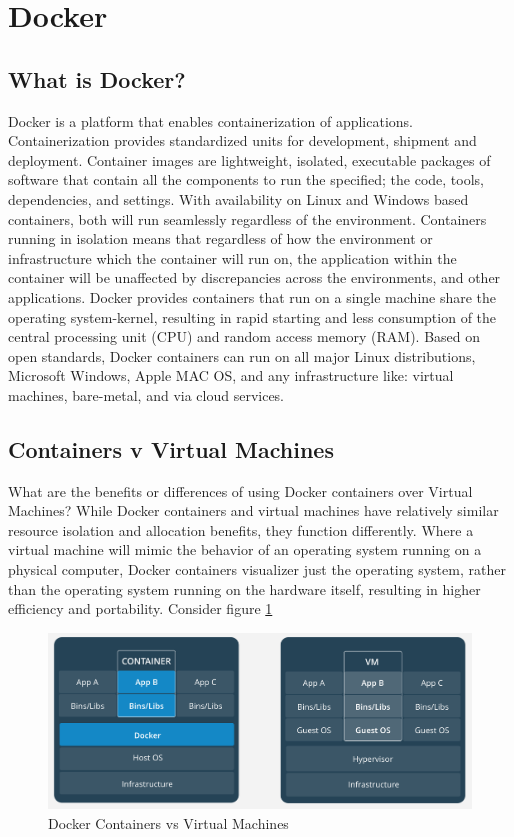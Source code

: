 \section{Docker}
\subsection{What is Docker?}
Docker is a platform that enables containerization of applications. Containerization provides standardized units for development, shipment and deployment. Container images are lightweight, isolated, executable packages of software that contain all the components to run the specified; the code, tools, dependencies, and settings. With availability on Linux and Windows based containers, both will run seamlessly regardless of the environment. Containers running in isolation means that regardless of how the environment or infrastructure which the container will run on, the application within the container will be unaffected by discrepancies across the environments, and other applications. Docker provides containers that run on a single machine share the operating system-kernel, resulting in rapid starting and less consumption of the central processing unit (CPU) and random access memory (RAM). Based on open standards, Docker containers can run on all major Linux distributions, Microsoft Windows, Apple MAC OS, and any infrastructure like: virtual machines, bare-metal, and via cloud services. 

\subsection{Containers v Virtual Machines}
What are the benefits or differences of using Docker containers over Virtual Machines? 
While Docker containers and virtual machines have relatively similar resource isolation and allocation benefits, they function differently. Where a virtual machine will mimic the behavior of an operating system running on a physical computer, Docker containers visualizer just the operating system, rather than the operating system running on the hardware itself, resulting in higher efficiency and portability. Consider figure \ref{fig:containervsvm}

\begin{figure}
\includegraphics[width=\textwidth]{img/containervvm.PNG}
\caption{Docker Containers vs Virtual Machines}
\label{fig:containervsvm}
\end{figure}


